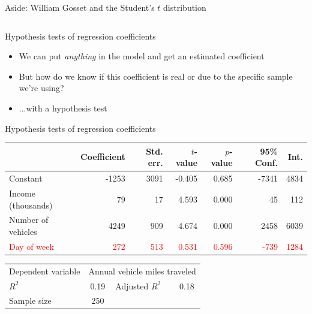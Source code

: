 \begin{frame}{Aside: William Gosset and the Student's $t$ distribution}
\begin{columns}
\begin{column}{0.44\textwidth}
\begin{overprint}
      \end{overprint}
    \end{column}
  \end{columns}
\end{frame}

\begin{frame}{Hypothesis tests of regression coefficients}
  \begin{itemize}
    \item We can put \textit{anything} in the model and get an estimated coefficient
    \item But how do we know if this coefficient is real or due to the specific sample we're using?
    \pause\item ...with a hypothesis test
  \end{itemize}
\end{frame}

\begin{frame}{Hypothesis tests of regression coefficients}
  \begin{tabular}{lrrrrrr}
  \toprule
  {} &  Coefficient &  Std. err. &  $t$-value &  $p$-value &  95\% Conf. &  Int. \\
  \midrule
  Constant           &        -1253 &       3091 &     -0.405 &      0.685 &      -7341 &  4834 \\
  Income (thousands) &          79 &         17 &      4.593 &      0.000 &         45 &   112 \\
  Number of vehicles &         4249 &        909 &      4.674 &      0.000 &       2458 &  6039 \\
  \textcolor{red}{Day of week}        &          \textcolor{red}{272} &       \textcolor{red}{ 513} &      \textcolor{red}{0.531} &      \textcolor{red}{0.596} &       \textcolor{red}{-739} & \textcolor{red}{ 1284} \\
  \bottomrule
  \end{tabular}
  \begin{tabular}{lclc}
  Dependent variable & \multicolumn{3}{l}{Annual vehicle miles traveled} \\
  $R^2$ & 0.19 & Adjusted $R^2$ & 0.18 \\
  Sample size & 250 && \\
  \end{tabular}\\
  \tiny\citenhts
\end{frame}

